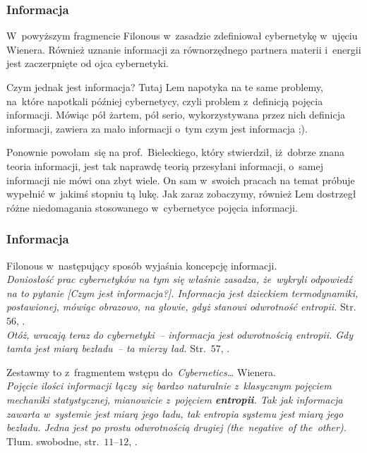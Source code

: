 \documentclass[10pt,t]{beamer}
\begin{document}
\begin{frame}
  \frametitle{Informacja}


  W~powyższym fragmencie Filonous w~zasadzie zdefiniował cybernetykę
  w~ujęciu Wienera. Również uznanie informacji za równorzędnego partnera
  materii i~energii jest zaczerpnięte od ojca cybernetyki.

  Czym jednak jest informacja? Tutaj Lem napotyka na te same problemy,
  na~które napotkali później cybernetycy, czyli problem z~definicją pojęcia
  informacji. Mówiąc pół żartem, pół serio, wykorzystywana przez nich
  definicja informacji, zawiera za mało informacji o~tym czym jest
  informacja ;).

  Ponownie powołam~się na prof.~Bieleckiego, który stwierdził, iż~dobrze
  znana teoria informacji, jest tak naprawdę teorią \alert{przesyłani}
  informacji, o~samej informacji nie mówi ona zbyt wiele. On sam w~swoich
  pracach na temat
   próbuje wypełnić w~jakimś stopniu tą lukę. Jak zaraz
  zobaczymy, również Lem dostrzegł różne niedomagania stosowanego
  w~cybernetyce pojęcia informacji.

\end{frame}





\begin{frame}
  \frametitle{Informacja}


  Filonous w~następujący sposób wyjaśnia koncepcję informacji. \\
  \textit{Doniosłość prac cybernetyków na tym się właśnie zasadza,
    że~wykryli odpowiedź na to pytanie [Czym jest informacja?]. Informacja
    jest dzieckiem termodynamiki, postawionej, mówiąc obrazowo, na głowie,
    gdyż stanowi odwrotność entropii.}
  Str.~$56$, \parencite{Lem-Dialogi-Vol-I-Pub-1996}. \\
  \textit{Otóż, wracają teraz do cybernetyki~-- informacja jest odwrotnością
    entropii. Gdy tamta jest miarą bezładu~-- ta mierzy ład.}
  Str.~$57$, \parencite{Lem-Dialogi-Vol-I-Pub-1996}.

  Zestawmy to z~fragmentem wstępu do~\textit{Cybernetics\ldots} Wienera. \\
  \textit{Pojęcie ilości informacji łączy~się bardzo naturalnie
    z~klasycznym pojęciem mechaniki statystycznej, mianowicie z~pojęciem
    \textbf{entropii}. Tak jak informacja zawarta w~systemie jest miarą jego
    ładu, tak entropia systemu jest miarą jego bezładu. Jedna jest po
    prostu odwrotnością drugiej (the~negative~of the~other).}
  Tłum. swobodne, str.~$11\text{--}12$,
  \parencite{Wiener-Cybernetics-Second-edition-Pub-2016}.

\end{frame}
\end{document}
